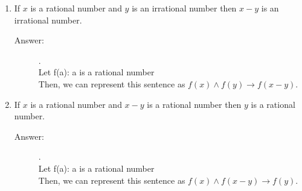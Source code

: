 \documentclass[12pt, oneside]{article}
\begin{document}
\begin{enumerate}
\begin{enumerate}
    \item If $x$ is a rational number and $y$ is an irrational number then $x-y$ is an irrational number.
    \begin{description}
        \item[Answer:] .\\
        Let f(a): a is a rational number\\
        Then, we can represent this sentence as $f(x) \land f(y) \rightarrow f(x-y)$.
    \end{description}
    \item  If $x$ is a rational number and $x-y$ is a rational number then $y$ is a rational number.
    \begin{description}
        \item[Answer:] .\\
        Let f(a): a is a rational number\\
        Then, we can represent this sentence as $f(x) \land f(x-y) \rightarrow f(y)$.
    \end{description}
\end{enumerate}
	

\end{enumerate}
\end{document}
